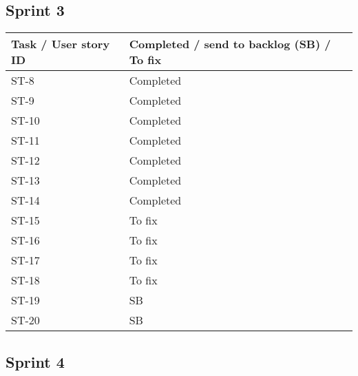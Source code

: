 \documentclass[12pt]{article}
\begin{document}
\subsection{Sprint 3}
{
\centering
\begin{longtable}{| p{7cm} | p{7cm}|}
			\hline			
			\textbf{Task / User story ID} & \textbf{Completed / send to backlog (SB) / To fix }
			 \\ \hline  ST-8 & Completed \\ \hline
             \hline  ST-9 & Completed \\ \hline
             \hline  ST-10 & Completed \\ \hline
             \hline  ST-11 & Completed \\ \hline
             \hline  ST-12 & Completed \\ \hline
             \hline  ST-13 & Completed \\ \hline
             \hline  ST-14 & Completed \\ \hline
             \hline  ST-15 & To fix \\ \hline
             \hline  ST-16 & To fix \\ \hline 
             \hline  ST-17 & To fix \\ \hline
             \hline  ST-18 & To fix \\ \hline
             \hline  ST-19 & SB \\ \hline
             \hline  ST-20 & SB \\ \hline
\end{longtable}
}
\subsection{Sprint 4}
\end{document}
